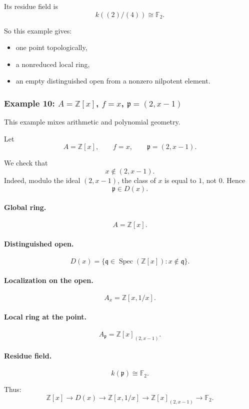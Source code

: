 \documentclass[12pt,a4paper]{article}
\theoremstyle{notespace}
\newcommand{\Spec}{\operatorname{Spec}}
\newcommand{\mf}{\mathfrak}
\theoremstyle{definition}
\begin{document}
Its residue field is
\[
k((2)/(4))\cong \mathbb F_2.
\]

So this example gives:

\begin{itemize}
	\item one point topologically,
	\item a nonreduced local ring,
	\item an empty distinguished open from a nonzero nilpotent element.
\end{itemize}

\subsubsection{Example 10: \(A=\mathbb Z[x]\), \(f=x\), \(\mf p=(2,x-1)\)}

This example mixes arithmetic and polynomial geometry.

Let
\[
A=\mathbb Z[x],
\qquad
f=x,
\qquad
\mf p=(2,x-1).
\]

We check that
\[
x\notin (2,x-1).
\]
Indeed, modulo the ideal \((2,x-1)\), the class of \(x\) is equal to \(1\), not \(0\). Hence
\[
\mf p\in D(x).
\]

\paragraph{Global ring.}
\[
A=\mathbb Z[x].
\]

\paragraph{Distinguished open.}
\[
D(x)=\{\mf q\in \Spec(\mathbb Z[x]): x\notin \mf q\}.
\]

\paragraph{Localization on the open.}
\[
A_x=\mathbb Z[x,1/x].
\]

\paragraph{Local ring at the point.}
\[
A_{\mf p}=\mathbb Z[x]_{(2,x-1)}.
\]

\paragraph{Residue field.}
\[
k(\mf p)\cong \mathbb F_2.
\]

Thus:
\[
\mathbb Z[x]
\longrightarrow
D(x)
\longrightarrow
\mathbb Z[x,1/x]
\longrightarrow
\mathbb Z[x]_{(2,x-1)}
\longrightarrow
\mathbb F_2.
\]
\end{document}
